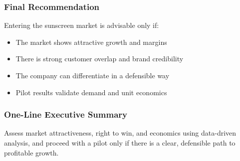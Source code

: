 \documentclass[10pt,a4paper]{article}
\begin{document}
	\subsubsection{Final Recommendation}
	
	Entering the sunscreen market is advisable only if:
	\begin{itemize}
	    \item The market shows attractive growth and margins
	    \item There is strong customer overlap and brand credibility
	    \item The company can differentiate in a defensible way
	    \item Pilot results validate demand and unit economics
	\end{itemize}
	
	\subsubsection{One-Line Executive Summary}
	
	Assess market attractiveness, right to win, and economics using data-driven analysis, and proceed with a pilot only if there is a clear, defensible path to profitable growth.
	
\end{document}

